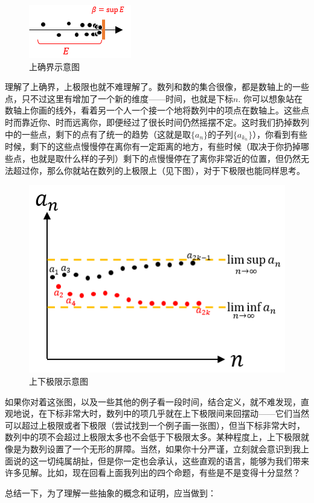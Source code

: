 \documentclass{ctexart}
\begin{document}
\begin{myexample}
  \begin{figure}[H]
    \centering
    \includegraphics[width=.22\linewidth]{fig/上确界.png}
    \caption{上确界示意图}
    \label{fig:sup}
  \end{figure}
  
  理解了上确界，上极限也就不难理解了。数列和数的集合很像，都是数轴上的一些点，只不过这里有增加了一个新的维度——时间，也就是下标$n$.
  你可以想象站在数轴上你画的线外，看着另一个人一个接一个地将数列中的项点在数轴上。这些点时而靠近你、时而远离你，即便经过了很长时间仍然摇摆不定。这时我们扔掉数列中的一些点，剩下的点有了统一的趋势（这就是取$\{ a_{n}\}$的子列$\{ a_{k_{n}}\}$），你看到有些时候，剩下的这些点慢慢停在离你有一定距离的地方，有些时候（取决于你扔掉哪些点，也就是取什么样的子列）剩下的点慢慢停在了离你非常近的位置，但仍然无法超过你，那么你就站在数列的上极限上（见下图），对于下极限也能同样思考。
  
  \begin{figure}[H]
    \centering
    \includegraphics[width=.45\linewidth]{fig/上极限.png}
    \caption{上下极限示意图}
    \label{fig:limsup}
  \end{figure}
  
  如果你对着这张图，以及一些其他的例子看一段时间，结合定义，就不难发现，直观地说，在下标非常大时，数列中的项几乎就在上下极限间来回摆动——它们当然可以超过上极限或者下极限（尝试找到一个例子画一张图），但当下标非常大时，数列中的项不会超过上极限太多也不会低于下极限太多。某种程度上，上下极限就像是为数列设置了一个无形的屏障。当然，如果你十分严谨，立刻就会意识到我上面说的这一切纯属胡扯，但是你一定也会承认，这些直观的语言，能够为我们带来许多见解。比如，现在回看上面我列出的四个命题，有些是不是变得十分显然？
\end{myexample}
  
  总结一下，为了理解一些抽象的概念和证明，应当做到：
  
\end{document}
